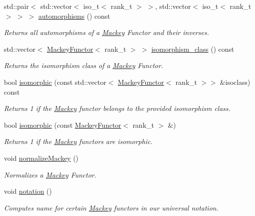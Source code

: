 \begin{DoxyCompactItemize}
std\+::pair$<$ std\+::vector$<$ iso\+\_\+t$<$ rank\+\_\+t $>$ $>$, std\+::vector$<$ iso\+\_\+t$<$ rank\+\_\+t $>$ $>$ $>$ \hyperlink{classMackey_1_1MackeyFunctor_ac7ef9ab9f3a13660a03c35e64dddd66b}{automorphisms} () const
\begin{DoxyCompactList}\small\item\em Returns all automorphisms of a \hyperlink{namespaceMackey}{Mackey} Functor and their inverses. \end{DoxyCompactList}\item 
std\+::vector$<$ \hyperlink{classMackey_1_1MackeyFunctor}{Mackey\+Functor}$<$ rank\+\_\+t $>$ $>$ \hyperlink{classMackey_1_1MackeyFunctor_a71e081ee78f53fe74e8f65106865f4c5}{isomorphism\+\_\+class} () const
\begin{DoxyCompactList}\small\item\em Returns the isomorphism class of a \hyperlink{namespaceMackey}{Mackey} Functor. \end{DoxyCompactList}\item 
bool \hyperlink{classMackey_1_1MackeyFunctor_a8cd5c9415c0c63c6d79dfa9b0067f416}{isomorphic} (const std\+::vector$<$ \hyperlink{classMackey_1_1MackeyFunctor}{Mackey\+Functor}$<$ rank\+\_\+t $>$$>$ \&isoclass) const
\begin{DoxyCompactList}\small\item\em Returns 1 if the \hyperlink{namespaceMackey}{Mackey} functor belongs to the provided isomorphism class. \end{DoxyCompactList}\item 
bool \hyperlink{classMackey_1_1MackeyFunctor_af183c1f4d1558bc3c7dc75dcf8161ee8}{isomorphic} (const \hyperlink{classMackey_1_1MackeyFunctor}{Mackey\+Functor}$<$ rank\+\_\+t $>$ \&)
\begin{DoxyCompactList}\small\item\em Returns 1 if the \hyperlink{namespaceMackey}{Mackey} functors are isomorphic. \end{DoxyCompactList}\item 
void \hyperlink{classMackey_1_1MackeyFunctor_a08150b3655fc27a7298d68b1857d830f}{normalize\+Mackey} ()
\begin{DoxyCompactList}\small\item\em Normalizes a \hyperlink{namespaceMackey}{Mackey} Functor. \end{DoxyCompactList}\item 
void \hyperlink{classMackey_1_1MackeyFunctor_a2b333a786e44000c96ffd087a81a1d17}{notation} ()
\begin{DoxyCompactList}\small\item\em Computes name for certain \hyperlink{namespaceMackey}{Mackey} functors in our universal notation. \end{DoxyCompactList}\end{DoxyCompactItemize}
